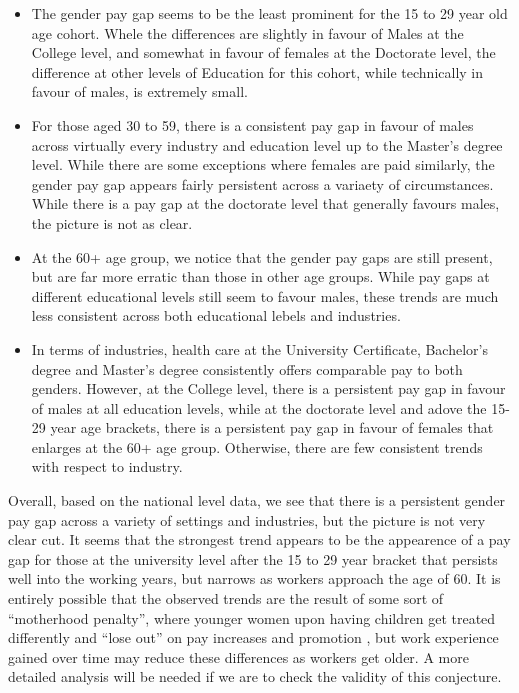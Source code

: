 \documentclass[]{article}
\providecommand{\tightlist}{%
  \setlength{\itemsep}{0pt}\setlength{\parskip}{0pt}}
\begin{document}
\begin{itemize}
\tightlist
\item
  The gender pay gap seems to be the least prominent for the 15 to 29
  year old age cohort. Whele the differences are slightly in favour of
  Males at the College level, and somewhat in favour of females at the
  Doctorate level, the difference at other levels of Education for this
  cohort, while technically in favour of males, is extremely small.
\item
  For those aged 30 to 59, there is a consistent pay gap in favour of
  males across virtually every industry and education level up to the
  Master's degree level. While there are some exceptions where females
  are paid similarly, the gender pay gap appears fairly persistent
  across a variaety of circumstances. While there is a pay gap at the
  doctorate level that generally favours males, the picture is not as
  clear.
\item
  At the 60+ age group, we notice that the gender pay gaps are still
  present, but are far more erratic than those in other age groups.
  While pay gaps at different educational levels still seem to favour
  males, these trends are much less consistent across both educational
  lebels and industries.
\item
  In terms of industries, health care at the University Certificate,
  Bachelor's degree and Master's degree consistently offers comparable
  pay to both genders. However, at the College level, there is a
  persistent pay gap in favour of males at all education levels, while
  at the doctorate level and adove the 15-29 year age brackets, there is
  a persistent pay gap in favour of females that enlarges at the 60+ age
  group. Otherwise, there are few consistent trends with respect to
  industry.
\end{itemize}

Overall, based on the national level data, we see that there is a
persistent gender pay gap across a variety of settings and industries,
but the picture is not very clear cut. It seems that the strongest trend
appears to be the appearence of a pay gap for those at the university
level after the 15 to 29 year bracket that persists well into the
working years, but narrows as workers approach the age of 60. It is
entirely possible that the observed trends are the result of some sort
of ``motherhood penalty'', where younger women upon having children get
treated differently and ``lose out'' on pay increases and promotion
\cite{budig2001wage}, but work experience gained over time may reduce
these differences as workers get older. A more detailed analysis will be
needed if we are to check the validity of this conjecture.
\end{document}
